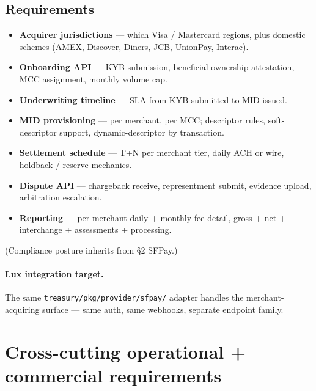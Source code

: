 \documentclass[11pt,letterpaper]{article}
\begin{document}
\subsection{Requirements}
\begin{itemize}[leftmargin=1.6em]
  \item \textbf{Acquirer jurisdictions} --- which Visa / Mastercard
        regions, plus domestic schemes (AMEX, Discover, Diners, JCB,
        UnionPay, Interac).
  \item \textbf{Onboarding API} --- KYB submission, beneficial-ownership
        attestation, MCC assignment, monthly volume cap.
  \item \textbf{Underwriting timeline} --- SLA from KYB submitted to
        MID issued.
  \item \textbf{MID provisioning} --- per merchant, per MCC; descriptor
        rules, soft-descriptor support, dynamic-descriptor by
        transaction.
  \item \textbf{Settlement schedule} --- T+N per merchant tier, daily
        ACH or wire, holdback / reserve mechanics.
  \item \textbf{Dispute API} --- chargeback receive, representment
        submit, evidence upload, arbitration escalation.
  \item \textbf{Reporting} --- per-merchant daily + monthly fee
        detail, gross + net + interchange + assessments + processing.
\end{itemize}

(Compliance posture inherits from \S2 SFPay.)

\paragraph{Lux integration target.}
The same \texttt{treasury/pkg/provider/sfpay/} adapter handles the
merchant-acquiring surface --- same auth, same webhooks, separate
endpoint family.

\section{Cross-cutting operational + commercial requirements}
\end{document}
